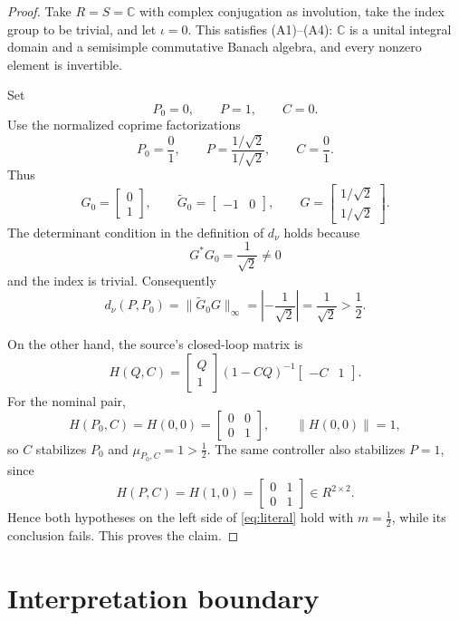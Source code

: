 \documentclass[11pt]{article}
\begin{document}
\begin{proof}
Take $R=S=\mathbb C$ with complex conjugation as involution, take the index
group to be trivial, and let $\iota=0$.  This satisfies (A1)--(A4):
$\mathbb C$ is a unital integral domain and a semisimple commutative Banach
algebra, and every nonzero element is invertible.

Set
\[
 P_0=0,\qquad P=1,\qquad C=0.
\]
Use the normalized coprime factorizations
\[
 P_0=\frac0{1},\qquad
 P=\frac{1/\sqrt2}{1/\sqrt2},\qquad
 C=\frac0{1}.
\]
Thus
\[
 G_0=\begin{bmatrix}0\\1\end{bmatrix},\qquad
 \widetilde G_0=\begin{bmatrix}-1&0\end{bmatrix},\qquad
 G=\begin{bmatrix}1/\sqrt2\\1/\sqrt2\end{bmatrix}.
\]
The determinant condition in the definition of $d_\nu$ holds because
\[
 G^*G_0=\frac1{\sqrt2}\ne0
\]
and the index is trivial.  Consequently
\[
 d_\nu(P,P_0)=\|\widetilde G_0G\|_\infty
 =\left|{-\frac1{\sqrt2}}\right|=\frac1{\sqrt2}>\frac12.
\]

On the other hand, the source's closed-loop matrix is
\[
 H(Q,C)=\begin{bmatrix}Q\\1\end{bmatrix}(1-CQ)^{-1}
          \begin{bmatrix}-C&1\end{bmatrix}.
\]
For the nominal pair,
\[
 H(P_0,C)=H(0,0)=\begin{bmatrix}0&0\\0&1\end{bmatrix},
 \qquad \|H(0,0)\|=1,
\]
so $C$ stabilizes $P_0$ and $\mu_{P_0,C}=1>\frac12$.  The same
controller also stabilizes $P=1$, since
\[
 H(P,C)=H(1,0)=\begin{bmatrix}0&1\\0&1\end{bmatrix}
 \in R^{2\times2}.
\]
Hence both hypotheses on the left side of \eqref{eq:literal} hold with
$m=\frac12$, while its conclusion fails.  This proves the claim.
\end{proof}

\section*{Interpretation boundary}
\end{document}
